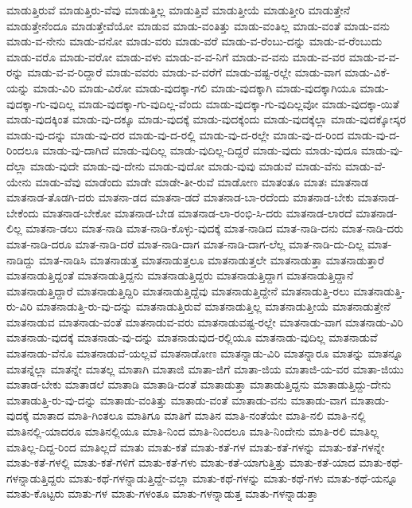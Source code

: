 {ಮಾಡುತ್ತಿರುವೆ
ಮಾಡುತ್ತಿರು-ವೆವು
ಮಾಡುತ್ತಿಲ್ಲ
ಮಾಡುತ್ತಿವೆ
ಮಾಡುತ್ತೀಯೆ
ಮಾಡುತ್ತೀರಿ
ಮಾಡುತ್ತೇನೆ
ಮಾಡುತ್ತೇನೆಂದೂ
ಮಾಡುತ್ತೇವೆಯೋ
ಮಾಡುವ
ಮಾಡು-ವಂತಿತ್ತು
ಮಾಡು-ವಂತಿಲ್ಲ
ಮಾಡು-ವಂತೆ
ಮಾಡು-ವನು
ಮಾಡು-ವ-ನೇನು
ಮಾಡು-ವನೋ
ಮಾಡು-ವರು
ಮಾಡು-ವರೆ
ಮಾಡು-ವ-ರೆಂಬು-ದನ್ನು
ಮಾಡು-ವ-ರೆಂಬುದು
ಮಾಡು-ವರೊ
ಮಾಡು-ವರೋ
ಮಾಡು-ವಳು
ಮಾಡು-ವ-ವ-ನಿಗೆ
ಮಾಡು-ವ-ವನು
ಮಾಡು-ವ-ವರ
ಮಾಡು-ವ-ವ-ರನ್ನು
ಮಾಡು-ವ-ವ-ರಿದ್ದಾರೆ
ಮಾಡು-ವವರು
ಮಾಡು-ವ-ವರೆಗೆ
ಮಾಡು-ವಷ್ಟ-ರಲ್ಲೇ
ಮಾಡು-ವಾಗ
ಮಾಡು-ವಿಕೆ-ಯನ್ನು
ಮಾಡು-ವಿರಿ
ಮಾಡು-ವಿರೋ
ಮಾಡು-ವುದಕ್ಕಾ-ಗಲಿ
ಮಾಡು-ವುದಕ್ಕಾಗಿ
ಮಾಡು-ವುದಕ್ಕಾಗಿಯೂ
ಮಾಡು-ವುದಕ್ಕಾ-ಗು-ವುದಿಲ್ಲ
ಮಾಡು-ವುದಕ್ಕಾ-ಗು-ವುದಿಲ್ಲ-ವೆಂದು
ಮಾಡು-ವುದಕ್ಕಾ-ಗು-ವುದಿಲ್ಲವೋ
ಮಾಡು-ವುದಕ್ಕಾ-ಯಿತೆ
ಮಾಡು-ವುದಕ್ಕಿಂತ
ಮಾಡು-ವು-ದಕ್ಕೂ
ಮಾಡು-ವುದಕ್ಕೆ
ಮಾಡು-ವುದಕ್ಕೆಂದು
ಮಾಡು-ವುದಕ್ಕೆಲ್ಲಾ
ಮಾಡು-ವುದಕ್ಕೋಸ್ಕರ
ಮಾಡು-ವು-ದನ್ನು
ಮಾಡು-ವು-ದರ
ಮಾಡು-ವು-ದ-ರಲ್ಲಿ
ಮಾಡು-ವು-ದ-ರಲ್ಲೇ
ಮಾಡು-ವು-ದ-ರಿಂದ
ಮಾಡು-ವು-ದ-ರಿಂದಲೂ
ಮಾಡು-ವು-ದಾಗಿದೆ
ಮಾಡು-ವುದಿಲ್ಲ
ಮಾಡು-ವುದಿಲ್ಲ-ದಿದ್ದರೆ
ಮಾಡು-ವುದು
ಮಾಡು-ವುದೂ
ಮಾಡು-ವು-ದೆಲ್ಲಾ
ಮಾಡು-ವುದೇ
ಮಾಡು-ವು-ದೇನು
ಮಾಡು-ವುದೋ
ಮಾಡು-ವುವು
ಮಾಡುವೆ
ಮಾಡು-ವೆನು
ಮಾಡು-ವೆ-ಯೇನು
ಮಾಡು-ವೆವು
ಮಾಡೆಂದು
ಮಾಡೇ
ಮಾಡೇ-ತೀ-ರುವೆ
ಮಾಡೋಣ
ಮಾತಂತೂ
ಮಾತಃ
ಮಾತನಾಡ
ಮಾತನಾಡ-ತೊಡಗಿ-ದರು
ಮಾತನಾ-ಡದ
ಮಾತನಾ-ಡದೆ
ಮಾತನಾಡ-ಬಾ-ರದೆಂದು
ಮಾತನಾಡ-ಬೇಕು
ಮಾತನಾಡ-ಬೇಕೆಂದು
ಮಾತನಾಡ-ಬೇಕೋ
ಮಾತನಾಡ-ಬೇಡ
ಮಾತನಾಡ-ಲಾ-ರಂಭಿ-ಸಿ-ದರು
ಮಾತನಾಡ-ಲಾರದೆ
ಮಾತನಾಡ-ಲಿಲ್ಲ
ಮಾತನಾ-ಡಲು
ಮಾತ-ನಾಡಿ
ಮಾತ-ನಾಡಿ-ಕೊಳ್ಳು-ವುದಕ್ಕೆ
ಮಾತ-ನಾಡಿದ
ಮಾತ-ನಾಡಿ-ದನು
ಮಾತ-ನಾಡಿ-ದರು
ಮಾತ-ನಾಡಿ-ದರೂ
ಮಾತ-ನಾಡಿ-ದರೆ
ಮಾತ-ನಾಡಿ-ದಾಗ
ಮಾತ-ನಾಡಿ-ದಾಗ-ಲೆಲ್ಲ
ಮಾತ-ನಾಡಿ-ದು-ದಿಲ್ಲ
ಮಾತ-ನಾಡಿದ್ದು
ಮಾತ-ನಾಡಿಸಿ
ಮಾತನಾಡುತ್ತ
ಮಾತನಾಡುತ್ತಲೂ
ಮಾತನಾಡುತ್ತಲೇ
ಮಾತನಾಡುತ್ತಾ
ಮಾತನಾಡುತ್ತಾರೆ
ಮಾತನಾಡುತ್ತಿದ್ದಂತೆ
ಮಾತನಾಡುತ್ತಿದ್ದನು
ಮಾತನಾಡುತ್ತಿದ್ದರು
ಮಾತನಾಡುತ್ತಿದ್ದಾಗ
ಮಾತನಾಡುತ್ತಿದ್ದಾನೆ
ಮಾತನಾಡುತ್ತಿದ್ದಾರೆ
ಮಾತನಾಡುತ್ತಿದ್ದಿರಿ
ಮಾತನಾಡುತ್ತಿದ್ದೆವು
ಮಾತನಾಡುತ್ತಿದ್ದೇನೆ
ಮಾತನಾಡುತ್ತಿ-ರಲು
ಮಾತನಾಡುತ್ತಿ-ರು-ವಿರಿ
ಮಾತನಾಡುತ್ತಿ-ರು-ವು-ದನ್ನು
ಮಾತನಾಡುತ್ತಿರುವೆ
ಮಾತನಾಡುತ್ತಿಲ್ಲ
ಮಾತನಾಡುತ್ತೀಯೆ
ಮಾತನಾಡುತ್ತೇನೆ
ಮಾತನಾಡುವ
ಮಾತನಾಡು-ವಂತೆ
ಮಾತನಾಡುವ-ವರು
ಮಾತನಾಡುವಷ್ಟ-ರಲ್ಲೇ
ಮಾತನಾಡು-ವಾಗ
ಮಾತನಾಡು-ವಿರಿ
ಮಾತನಾಡು-ವುದಕ್ಕೆ
ಮಾತನಾಡು-ವು-ದನ್ನು
ಮಾತನಾಡುವುದ-ರಲ್ಲಿಯೂ
ಮಾತನಾಡು-ವುದಿಲ್ಲ
ಮಾತನಾಡುವೆ
ಮಾತನಾಡು-ವೆನೊ
ಮಾತನಾಡುವೆ-ಯಲ್ಲವೆ
ಮಾತನಾಡೋಣ
ಮಾತನ್ನಾಡು-ವಿರಿ
ಮಾತನ್ನಾರೂ
ಮಾತನ್ನು
ಮಾತನ್ನೂ
ಮಾತನ್ನೆಲ್ಲಾ
ಮಾತನ್ನೇ
ಮಾತಲ್ಲ
ಮಾತಾಗಿ
ಮಾತಾಜಿ
ಮಾತಾ-ಜಿಗೆ
ಮಾತಾ-ಜಿಯ
ಮಾತಾಜಿ-ಯ-ವರ
ಮಾತಾ-ಜಿಯು
ಮಾತಾಡ-ಬೇಕು
ಮಾತಾಡಲೆ
ಮಾತಾಡಿ
ಮಾತಾಡಿ-ದಂತೆ
ಮಾತಾಡುತ್ತಾ
ಮಾತಾಡುತ್ತಿದ್ದನು
ಮಾತಾಡುತ್ತಿದ್ದು-ದೇನು
ಮಾತಾಡುತ್ತಿ-ರು-ವು-ದನ್ನು
ಮಾತಾಡು-ವಂತಿತ್ತು
ಮಾತಾಡು-ವಂತೆ
ಮಾತಾಡು-ವನು
ಮಾತಾಡು-ವಾಗ
ಮಾತಾಡು-ವುದಕ್ಕೆ
ಮಾತಾದ
ಮಾತಿ-ಗಿಂತಲೂ
ಮಾತಿಗೂ
ಮಾತಿಗೆ
ಮಾತಿನ
ಮಾತಿ-ನಂತೆಯೇ
ಮಾತಿ-ನಲಿ
ಮಾತಿ-ನಲ್ಲಿ
ಮಾತಿನಲ್ಲಿ-ಯಾದರೂ
ಮಾತಿನಲ್ಲಿಯೂ
ಮಾತಿ-ನಿಂದ
ಮಾತಿ-ನಿಂದಲೂ
ಮಾತಿ-ನಿಂದೇನು
ಮಾತಿ-ರಲಿ
ಮಾತಿಲ್ಲ
ಮಾತಿಲ್ಲ-ದಿದ್ದ-ರಿಂದ
ಮಾತಿಲ್ಲದೆ
ಮಾತು
ಮಾತು-ಕತೆ
ಮಾತು-ಕತೆ-ಗಳ
ಮಾತು-ಕತೆ-ಗಳನ್ನು
ಮಾತು-ಕತೆ-ಗಳನ್ನೇ
ಮಾತು-ಕತೆ-ಗಳಲ್ಲಿ
ಮಾತು-ಕತೆ-ಗಳಿಗೆ
ಮಾತು-ಕತೆ-ಗಳು
ಮಾತು-ಕತೆ-ಯಾಗುತ್ತಿತ್ತು
ಮಾತು-ಕತೆ-ಯಾದ
ಮಾತು-ಕಥೆ-ಗಳನ್ನಾಡುತ್ತಿದ್ದರು
ಮಾತು-ಕಥೆ-ಗಳನ್ನಾಡುತ್ತಿದ್ದೇ-ವಲ್ಲಾ
ಮಾತು-ಕಥೆ-ಗಳನ್ನು
ಮಾತು-ಕಥೆ-ಗಳು
ಮಾತು-ಕಥೆ-ಯನ್ನೂ
ಮಾತು-ಕೊಟ್ಟರು
ಮಾತು-ಗಳ
ಮಾತು-ಗಳಂತೂ
ಮಾತು-ಗಳನ್ನಾಡುತ್ತ
ಮಾತು-ಗಳನ್ನಾಡುತ್ತಾ
}
